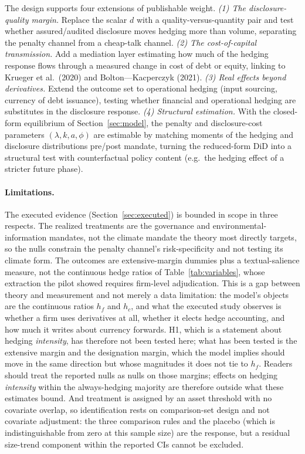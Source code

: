 \documentclass[11pt,a4paper]{article}
\begin{document}
The design supports four extensions of publishable weight. \emph{(1) The disclosure-quality margin.} Replace the scalar $d$ with a quality-versus-quantity pair and test whether assured/audited disclosure moves hedging more than volume, separating the penalty channel from a cheap-talk channel. \emph{(2) The cost-of-capital transmission.} Add a mediation layer estimating how much of the hedging response flows through a measured change in cost of debt or equity, linking to Krueger et al.\ (2020) and Bolton---Kacperczyk (2021). \emph{(3) Real effects beyond derivatives.} Extend the outcome set to operational hedging (input sourcing, currency of debt issuance), testing whether financial and operational hedging are substitutes in the disclosure response. \emph{(4) Structural estimation.} With the closed-form equilibrium of Section~\ref{sec:model}, the penalty and disclosure-cost parameters $(\lambda,k,a,\phi)$ are estimable by matching moments of the hedging and disclosure distributions pre/post mandate, turning the reduced-form DiD into a structural test with counterfactual policy content (e.g.\ the hedging effect of a stricter future phase).

\paragraph{Limitations.}

The executed evidence (Section~\ref{sec:executed}) is bounded in scope in three respects. The realized treatments are the governance and environmental-information mandates, not the climate mandate the theory most directly targets, so the nulls constrain the penalty channel's risk-specificity and not testing its climate form. The outcomes are extensive-margin dummies plus a textual-salience measure, not the continuous hedge ratios of Table~\ref{tab:variables}, whose extraction the pilot showed requires firm-level adjudication. This is a gap between theory and measurement and not merely a data limitation: the model's objects are the continuous ratios $h_f$ and $h_c$, and what the executed study observes is whether a firm uses derivatives at all, whether it elects hedge accounting, and how much it writes about currency forwards. H1, which is a statement about hedging \emph{intensity}, has therefore not been tested here; what has been tested is the extensive margin and the designation margin, which the model implies should move in the same direction but whose magnitudes it does not tie to $h_f$. Readers should treat the reported nulls as nulls on those margins; effects on hedging \emph{intensity} within the always-hedging majority are therefore outside what these estimates bound. And treatment is assigned by an asset threshold with no covariate overlap, so identification rests on comparison-set design and not covariate adjustment: the three comparison rules and the placebo (which is indistinguishable from zero at this sample size) are the response, but a residual size-trend component within the reported CIs cannot be excluded.
\end{document}
